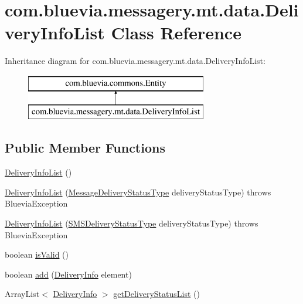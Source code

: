 \hypertarget{classcom_1_1bluevia_1_1messagery_1_1mt_1_1data_1_1DeliveryInfoList}{
\section{com.bluevia.messagery.mt.data.DeliveryInfoList Class Reference}
\label{classcom_1_1bluevia_1_1messagery_1_1mt_1_1data_1_1DeliveryInfoList}
}
Inheritance diagram for com.bluevia.messagery.mt.data.DeliveryInfoList:\begin{figure}[H]
\begin{center}
\leavevmode
\includegraphics[height=2.000000cm]{classcom_1_1bluevia_1_1messagery_1_1mt_1_1data_1_1DeliveryInfoList}
\end{center}
\end{figure}
\subsection*{Public Member Functions}
\begin{DoxyCompactItemize}
\item 
\hyperlink{classcom_1_1bluevia_1_1messagery_1_1mt_1_1data_1_1DeliveryInfoList_a855c58de358660ec7dde979c72e9203c}{DeliveryInfoList} ()
\item 
\hyperlink{classcom_1_1bluevia_1_1messagery_1_1mt_1_1data_1_1DeliveryInfoList_aaf4baee4a1e0d1ad19e9cf35fd4bb5be}{DeliveryInfoList} (\hyperlink{classcom_1_1telefonica_1_1schemas_1_1unica_1_1rest_1_1mms_1_1v1_1_1MessageDeliveryStatusType}{MessageDeliveryStatusType} deliveryStatusType)  throws BlueviaException 
\item 
\hyperlink{classcom_1_1bluevia_1_1messagery_1_1mt_1_1data_1_1DeliveryInfoList_aa2c315b2b4c33e3f6f66394eb265b13b}{DeliveryInfoList} (\hyperlink{classcom_1_1telefonica_1_1schemas_1_1unica_1_1rest_1_1sms_1_1v1_1_1SMSDeliveryStatusType}{SMSDeliveryStatusType} deliveryStatusType)  throws BlueviaException 
\item 
boolean \hyperlink{classcom_1_1bluevia_1_1messagery_1_1mt_1_1data_1_1DeliveryInfoList_a726b2be32c5d4a072fa2983a0bae2d3f}{isValid} ()
\item 
boolean \hyperlink{classcom_1_1bluevia_1_1messagery_1_1mt_1_1data_1_1DeliveryInfoList_a7a7835aba7e5632483ad51ae93b5c67a}{add} (\hyperlink{classcom_1_1bluevia_1_1messagery_1_1mt_1_1data_1_1DeliveryInfo}{DeliveryInfo} element)
\item 
ArrayList$<$ \hyperlink{classcom_1_1bluevia_1_1messagery_1_1mt_1_1data_1_1DeliveryInfo}{DeliveryInfo} $>$ \hyperlink{classcom_1_1bluevia_1_1messagery_1_1mt_1_1data_1_1DeliveryInfoList_ab688a25c40e21722a891f8b0eb4ad1bc}{getDeliveryStatusList} ()
\end{DoxyCompactItemize}


